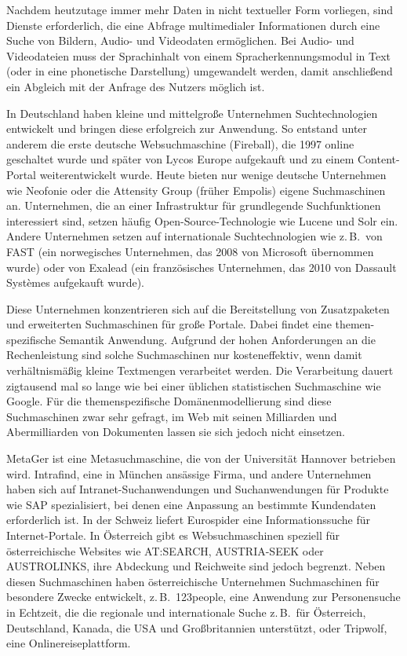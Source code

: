 \documentclass[]{../../metanetpaper}
\begin{document}
\begin{multicols}{2}
Nachdem heutzutage immer mehr Daten in nicht textueller Form vorliegen, sind Dienste erforderlich, die eine Abfrage multimedialer Informationen durch eine Suche von Bildern, Audio- und Videodaten ermöglichen. Bei Audio- und Videodateien muss der Sprachinhalt von einem Spracherkennungsmodul in Text (oder in eine phonetische Darstellung) umgewandelt werden, damit anschließend ein Abgleich mit der Anfrage des Nutzers möglich ist.

In Deutschland haben kleine und mittelgroße Unternehmen Suchtechnologien entwickelt und bringen diese erfolgreich zur Anwendung. So entstand unter anderem die erste deutsche Websuchmaschine (Fireball), die 1997 online geschaltet wurde und später von Lycos Europe aufgekauft und zu einem Con\-tent-Por\-tal weiterentwickelt wurde. Heute bieten nur wenige deutsche Unternehmen wie Neofonie oder die Attensity Group (früher Empolis) eigene Suchmaschinen an. Unternehmen, die an einer Infrastruktur für grundlegende Suchfunktionen interessiert sind, setzen häufig Open-Source-Tech\-no\-lo\-gie wie Lucene und Solr ein. Andere Unternehmen setzen auf internationale Suchtechnologien wie z.\,B.~von FAST (ein norwegisches Unternehmen, das 2008 von Microsoft übernommen wurde) oder von Exalead (ein französisches Unternehmen, das 2010 von Dassault Systèmes aufgekauft wurde).

Diese Unternehmen konzentrieren sich auf die Bereitstellung von Zusatzpaketen und erweiterten Suchmaschinen für große Portale. Dabei findet eine the\-men-spe\-zi\-fische Semantik Anwendung. Aufgrund der hohen Anforderungen an die Rechenleistung sind solche Suchmaschinen nur kosteneffektiv, wenn damit verhältnismäßig kleine Textmengen verarbeitet werden. Die Verarbeitung dauert zigtausend mal so lange wie bei einer üblichen statistischen Suchmaschine wie Google. Für die themenspezifische Domänenmodellierung sind diese Suchmaschinen zwar sehr gefragt, im Web mit seinen Milliarden und Abermilliarden von Dokumenten lassen sie sich jedoch nicht einsetzen.

MetaGer ist eine Metasuchmaschine, die von der Universität Hannover betrieben wird. Intrafind, eine in München ansässige Firma, und andere Unternehmen haben sich auf In\-tra\-net-Such\-an\-wen\-dungen und Suchanwendungen für Produkte wie SAP spezialisiert, bei denen eine Anpassung an bestimmte Kundendaten erforderlich ist. In der Schweiz liefert Eurospider eine Informationssuche für In\-ter\-net-Por\-tale. In Österreich gibt es Websuchmaschinen speziell für österreichische Websites wie AT:SEARCH, AUSTRIA-SEEK oder AUSTROLINKS, ihre Abdeckung und Reichweite sind jedoch begrenzt. Neben diesen Suchmaschinen haben österreichische Unternehmen Suchmaschinen für besondere Zwecke entwickelt, z.\,B.~123people, eine Anwendung zur Personensuche in Echtzeit, die die regionale und internationale Suche z.\,B.~für Österreich, Deutschland, Kanada, die USA und Großbritannien unterstützt, oder Tripwolf, eine Onlinereiseplattform.
  

\end{multicols}
\end{document}
